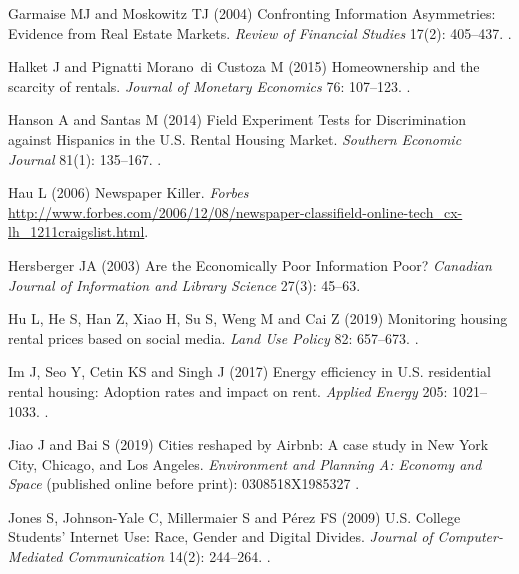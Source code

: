 \documentclass[11pt,letterpaper]{article}
\begin{document}
\begin{thebibliography}{77}
	Garmaise MJ and Moskowitz TJ (2004) Confronting {Information} {Asymmetries}:
	{Evidence} from {Real} {Estate} {Markets}.
	\newblock \emph{Review of Financial Studies} 17(2): 405--437.
	\newblock {}.
	
	Halket J and Pignatti Morano~di Custoza M (2015) Homeownership and the scarcity
	of rentals.
	\newblock \emph{Journal of Monetary Economics} 76: 107--123.
	\newblock {}.
	
	Hanson A and Santas M (2014) Field {Experiment} {Tests} for {Discrimination}
	against {Hispanics} in the {U}.{S}. {Rental} {Housing} {Market}.
	\newblock \emph{Southern Economic Journal} 81(1): 135--167.
	\newblock {}.
	
	Hau L (2006) Newspaper {Killer}.
	\newblock \emph{Forbes}
	\urlprefix\url{http://www.forbes.com/2006/12/08/newspaper-classifield-online-tech_cx-lh_1211craigslist.html}.
	
	Hersberger JA (2003) Are the {Economically} {Poor} {Information} {Poor}?
	\newblock \emph{Canadian Journal of Information and Library Science} 27(3):
	45--63.
	
	Hu L, He S, Han Z, Xiao H, Su S, Weng M and Cai Z (2019) Monitoring housing
	rental prices based on social media.
	\newblock \emph{Land Use Policy} 82: 657--673.
	\newblock {}.
	
	Im J, Seo Y, Cetin KS and Singh J (2017) Energy efficiency in {U}.{S}.
	residential rental housing: {Adoption} rates and impact on rent.
	\newblock \emph{Applied Energy} 205: 1021--1033.
	\newblock {}.
	
	Jiao J and Bai S (2019) Cities reshaped by {Airbnb}: {A} case study in {New}
	{York} {City}, {Chicago}, and {Los} {Angeles}.
	\newblock \emph{Environment and Planning A: Economy and Space} (published online before print):
	0308518X1985327 .
	
	Jones S, Johnson-Yale C, Millermaier S and Pérez FS (2009) U.{S}. {College}
	{Students}' {Internet} {Use}: {Race}, {Gender} and {Digital} {Divides}.
	\newblock \emph{Journal of Computer-Mediated Communication} 14(2): 244--264.
	\newblock {}.
	

\end{thebibliography}
\end{document}
